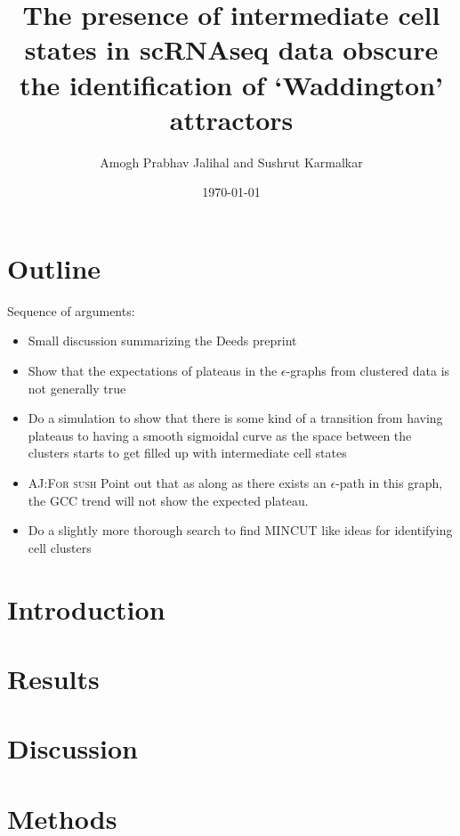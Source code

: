 \documentclass[11pt]{article}
\author{Amogh Prabhav Jalihal and Sushrut Karmalkar}
\date{\today}
\title{\amogh{wip} The presence of intermediate cell states in scRNAseq data obscure the identification of `Waddington' attractors }
\newcommand{\amogh}[1]{{\textsc{\color{blue} AJ:#1}}}
\newcommand{\todo}{{\color{red}{\small TODO\ }}}
\begin{document}
\maketitle
\section*{Outline}
Sequence of arguments:
\begin{itemize}
\item \todo Small discussion summarizing the Deeds preprint
\item \todo Show that the expectations of plateaus in the $\epsilon$-graphs from clustered data is not generally true
\item \todo Do a simulation to show that there is some kind of a transition from having plateaus to having a smooth sigmoidal curve as the space between the clusters starts to get filled up with intermediate cell states
\item \todo \amogh{For sush} Point out that as along as there exists an $\epsilon$-path in this graph, the GCC trend will not show the expected plateau.
\item \todo Do a slightly more thorough search to find \textsc{MINCUT} like ideas for identifying cell clusters
\end{itemize}


 
\section*{Introduction}
\label{sec:orgc8a6b0e}
\section*{Results}
\label{sec:org8da0183}
\section*{Discussion}
\label{sec:org4e03e49}

\section*{Methods}
\label{sec:org7a0bf76}


\end{document}

